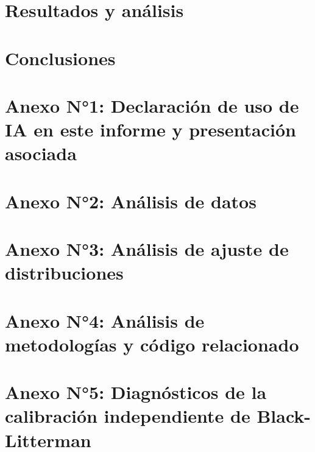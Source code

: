 \documentclass[pdftex,spanish]{pucthesis}	%
\begin{document}
\chapter{Resultados y análisis}


  \chapter{Conclusiones}



\cleardoublepage
{} \label{references}

\renewcommand{\bibname}{Referencias}






\cleardoublepage
{}\label{anexo:ia}
\chapter*{Anexo N°1: Declaración de uso de IA en este informe y presentación asociada}


\cleardoublepage
{}\label{anexo:datos}
\chapter*{Anexo N°2: Análisis de datos}


\cleardoublepage
{}\label{anexo:ajuste}
\chapter*{Anexo N°3: Análisis de ajuste de distribuciones}


\cleardoublepage
{}\label{anexo:metodologias}
\chapter*{Anexo N°4: Análisis de metodologías y código relacionado}


\cleardoublepage
{}\label{anexo:calibracion}
\chapter*{Anexo N°5: Diagnósticos de la calibración independiente de Black-Litterman}


\cleardoublepage

\end{document}
